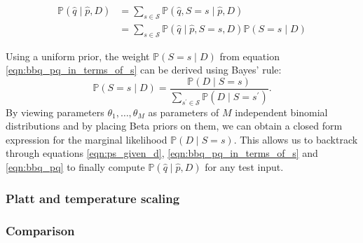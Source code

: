 \begin{align}
\label{eqn:bbq_pq}
\mathbb{P}\left(\hat{q} \mid \hat{p}, D\right) &= \sum_{s \in \mathcal{S}} \mathbb{P}\left(\hat{q}, S=s \mid \hat{p}, D\right) \\
\label{eqn:bbq_pq_in_terms_of_s}
&= \sum_{s \in \mathcal{S}} \mathbb{P}\left(\hat{q} \mid \hat{p}, S=s, D\right) \mathbb{P}(S=s \mid D)
\end{align}

Using a uniform prior, the weight $\mathbb{P}(S=s \mid D)$ from equation \ref{eqn:bbq_pq_in_terms_of_s} can be derived using Bayes' rule:
\begin{equation}
\label{eqn:ps_given_d}
\mathbb{P}(S=s \mid D)=\frac{\mathbb{P}(D \mid S=s)}{\sum_{s^{\prime} \in \mathcal{S}} \mathbb{P}\left(D \mid S=s^{\prime}\right)}.
\end{equation}
By viewing parameters $\theta_{1}, \ldots, \theta_{M}$ as parameters of $M$ independent binomial distributions and by placing Beta priors on them, we can obtain a closed form expression for the marginal likelihood $\mathbb{P}(D \mid S=s)$. This allows us to backtrack through equations \ref{eqn:ps_given_d}, \ref{eqn:bbq_pq_in_terms_of_s} and \ref{eqn:bbq_pq} to finally compute $\mathbb{P}\left(\hat{q} \mid \hat{p}, D\right)$ for any test input.

\subsubsection{Platt and temperature scaling}
\subsubsection{Comparison}

